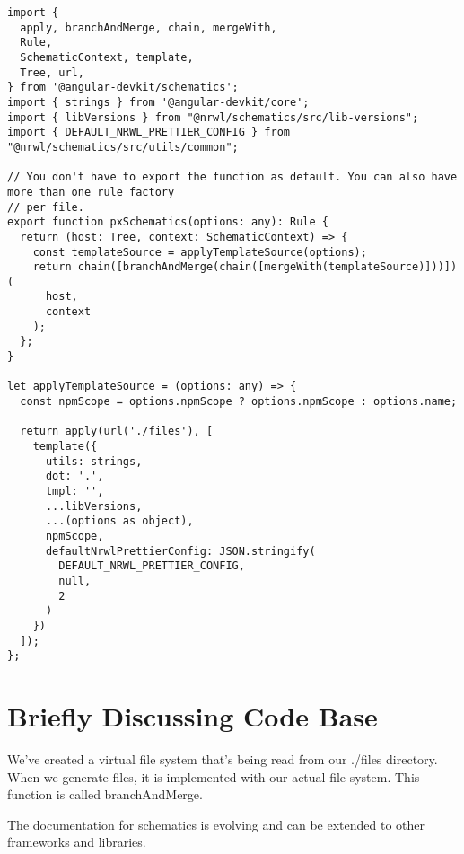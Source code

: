 \begin{lstlisting}
import {
  apply, branchAndMerge, chain, mergeWith,
  Rule,
  SchematicContext, template,
  Tree, url,
} from '@angular-devkit/schematics';
import { strings } from '@angular-devkit/core';
import { libVersions } from "@nrwl/schematics/src/lib-versions";
import { DEFAULT_NRWL_PRETTIER_CONFIG } from "@nrwl/schematics/src/utils/common";

// You don't have to export the function as default. You can also have more than one rule factory
// per file.
export function pxSchematics(options: any): Rule {
  return (host: Tree, context: SchematicContext) => {
    const templateSource = applyTemplateSource(options);
    return chain([branchAndMerge(chain([mergeWith(templateSource)]))])(
      host,
      context
    );
  };
}

let applyTemplateSource = (options: any) => {
  const npmScope = options.npmScope ? options.npmScope : options.name;

  return apply(url('./files'), [
    template({
      utils: strings,
      dot: '.',
      tmpl: '',
      ...libVersions,
      ...(options as object),
      npmScope,
      defaultNrwlPrettierConfig: JSON.stringify(
        DEFAULT_NRWL_PRETTIER_CONFIG,
        null,
        2
      )
    })
  ]);
};
\end{lstlisting}

\section{ Briefly Discussing Code Base}
We've created a virtual file system that's being read from our ./files directory. When we generate files, it is implemented with our actual file system. This function is called branchAndMerge. 

The documentation for schematics is evolving and can be extended to other frameworks and libraries. 
